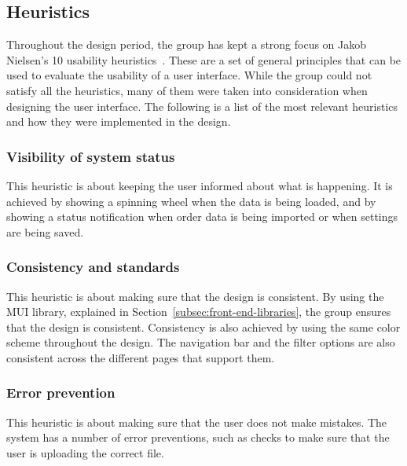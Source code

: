 \subsection{Heuristics}\label{subsec:heuristics}

Throughout the design period, the group has kept a strong focus on Jakob Nielsen's 10 usability
heuristics~\cite{usability-heuristics}.
These are a set of general principles that can be used to evaluate the usability of a user interface.
While the group could not satisfy all the heuristics, many of them were taken into consideration when designing the
user interface.
The following is a list of the most relevant heuristics and how they were implemented in the design.

\subsubsection{Visibility of system status}\label{subsubsec:visibility-of-system-status}

This heuristic is about keeping the user informed about what is happening.
It is achieved by showing a spinning wheel when the data is being loaded, and by showing a status notification
when order data is being imported or when settings are being saved.

\subsubsection{Consistency and standards}\label{subsubsec:consistency-and-standards}

This heuristic is about making sure that the design is consistent.
By using the MUI library, explained in Section~\ref{subsec:front-end-libraries}, the group ensures that the design is
consistent.
Consistency is also achieved by using the same color scheme throughout the design.
The navigation bar and the filter options are also consistent across the different pages that support them.

\subsubsection{Error prevention}\label{subsubsec:error-prevention}

This heuristic is about making sure that the user does not make mistakes.
The system has a number of error preventions, such as checks to make sure that the user is uploading the correct file.

